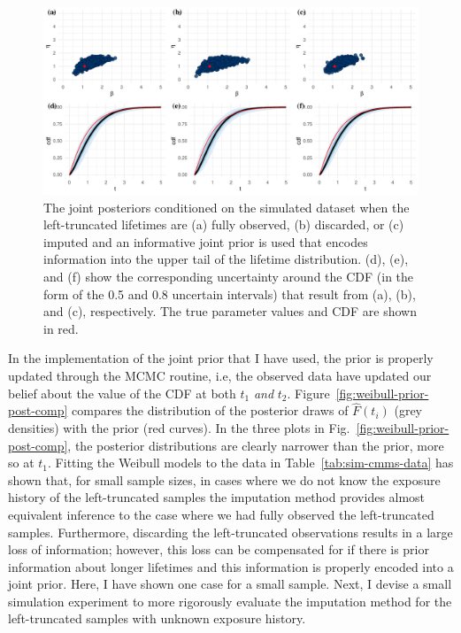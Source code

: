 \begin{figure}
    \centering
    \includegraphics[width=1\textwidth]{./figures/ch-2/joint-posts-inf.pdf}
    \caption{The joint posteriors conditioned on the simulated dataset when the left-truncated lifetimes are (a) fully observed, (b) discarded, or (c) imputed and an informative joint prior is used that encodes information into the upper tail of the lifetime distribution. (d), (e), and (f) show the corresponding uncertainty around the CDF (in the form of the 0.5 and 0.8 uncertain intervals) that result from (a), (b), and (c), respectively. The true parameter values and CDF are shown in red.}
    \label{fig:joint-post-weibull-inf}
\end{figure}

In the implementation of the joint prior that I have used, the prior is properly updated through the MCMC routine, i.e, the observed data have updated our belief about the value of the CDF at both $t_1$ \emph{and} $t_2$. Figure~\ref{fig:weibull-prior-post-comp} compares the distribution of the posterior draws of $\hat{F}(t_i)$ (grey densities) with the prior (red curves). In the three plots in Fig.~\ref{fig:weibull-prior-post-comp}, the posterior distributions are clearly narrower than the prior, more so at $t_1$. Fitting the Weibull models to the data in Table~\ref{tab:sim-cmms-data} has shown that, for small sample sizes, in cases where we do not know the exposure history of the left-truncated samples the imputation method provides almost equivalent inference to the case where we had fully observed the left-truncated samples. Furthermore, discarding the left-truncated observations results in a large loss of information; however, this loss can be compensated for if there is prior information about longer lifetimes and this information is properly encoded into a joint prior. Here, I have shown one case for a small sample. Next, I devise a small simulation experiment to more rigorously evaluate the imputation method for the left-truncated samples with unknown exposure history.

